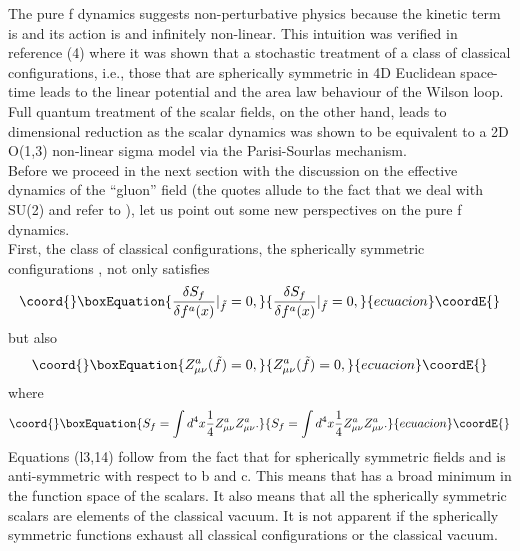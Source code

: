 \documentclass[a4paper,12pt]{article}
\begin{document}
The pure f dynamics suggests non-perturbative physics because the kinetic term is \coordHE{} and its action is \coordHE{} and infinitely non-linear.  This intuition was verified in reference (4) where it was shown that a stochastic treatment of a class of classical configurations, i.e., those that are spherically symmetric in 4D Euclidean space-time leads to the linear potential and the area law behaviour of the Wilson loop.  Full quantum treatment of the scalar fields, on the other hand, leads to dimensional reduction as the scalar dynamics was shown to be equivalent to a 2D O(1,3) non-linear sigma model via the Parisi-Sourlas mechanism.\\

Before we proceed in the next section with the discussion on the effective dynamics of the ``gluon'' field (the quotes allude to the fact that we deal with SU(2) and refer to \coordHE{}), let us point out some new perspectives on the pure f dynamics.\\

First, the class of classical configurations, the spherically symmetric configurations \coordHE{}, not only satisfies
\begin{equation}\coord{}\boxEquation{\label{7}
\frac{\delta S_{f}}{\delta f^{a}(x)}\vert_{\tilde{f}}=0,
}{\frac{\delta S_{f}}{\delta f^{a}(x)}\vert_{\tilde{f}}=0,
}{ecuacion}\coordE{}\end{equation}
but also
\begin{equation}\coord{}\boxEquation{\label{8}
Z^{a}_{\mu\nu}(\tilde{f}) = 0,
}{Z^{a}_{\mu\nu}(\tilde{f}) = 0,
}{ecuacion}\coordE{}\end{equation}
where
\begin{equation}\coord{}\boxEquation{\label{9}
S_{f} = \int d^{4}x\frac{1}{4}Z^{a}_{\mu\nu} Z^{a}_{\mu\nu}.
}{S_{f} = \int d^{4}x\frac{1}{4}Z^{a}_{\mu\nu} Z^{a}_{\mu\nu}.
}{ecuacion}\coordE{}\end{equation}
Equations (l3,14) follow from the fact that for spherically symmetric fields \coordHE{} and \coordHE{} is anti-symmetric with respect to b and c.  This means that \coordHE{} has a broad minimum in the function space of the scalars.  It also means that all the spherically symmetric scalars are elements of the classical vacuum.  It is not apparent if the spherically symmetric functions exhaust all classical configurations or the classical vacuum.\\
\end{document}
